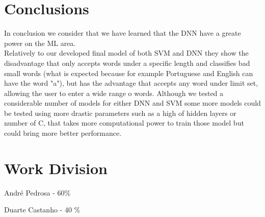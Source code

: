 \documentclass[journal, a4paper]{IEEEtran}
\begin{document}
\section{Conclusions}
    In conclusion we consider that we have learned that the DNN have a greate power on the ML area. \\
    Relatively to our developed final model of both SVM and DNN they show the disadvantage that only
accepts words under a specific length and classifies bad small words (what is expected because for
example Portuguese and English can have the word "a"), but has the advantage that accepts any word under
limit set, allowing the user to enter a wide range o words.
    Although we tested a considerable number of models for either DNN and SVM some more models could be
tested using more drastic parameters such as a high of hidden layers or number of C, that takes more
computational power to train those model but could bring more better performance.

\section{Work Division}

  André Pedrosa - 60\%

  Duarte Castanho - 40 \%
\end{document}
